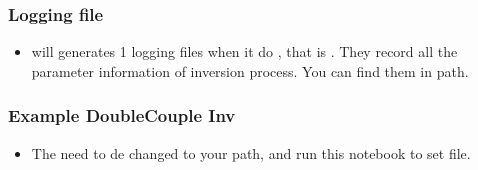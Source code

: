 \documentclass[a4paper,10pt,english,openany]{sphinxmanual}
\begin{document}
\begin{sphinxVerbatim}[commandchars=\\\{\},numbers=left,firstnumber=1,stepnumber=1]
   
    
\end{sphinxVerbatim}


\subsubsection{Logging file}
\label{\detokenize{tutorials/S4_Inv_DC:logging-file}}\begin{itemize}
\item {} 
 will generates 1 logging files when it do , that is .
They record all the parameter information of inversion process. You can find them
in  path.

\end{itemize}


\subsubsection{Example Double\sphinxhyphen{}Couple Inv}
\label{\detokenize{tutorials/S4_Inv_DC:example-double-couple-inv}}\begin{itemize}
\item {} 
The  need to de changed to your path, and run this notebook to set  file.

\end{itemize}
\end{document}

